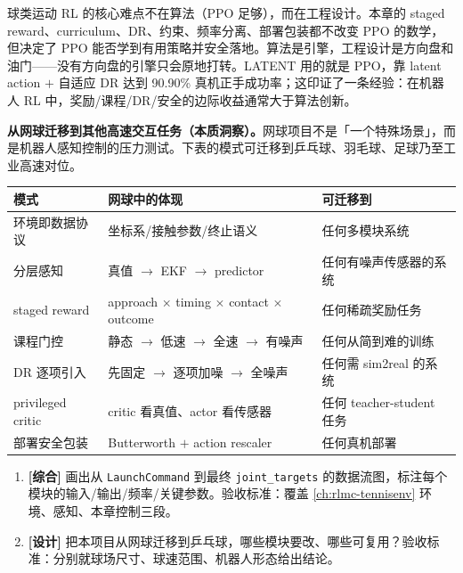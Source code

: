 \begin{insight}\label{ins:rlmc-strike-engineering}
球类运动 RL 的核心难点不在算法（PPO 足够），而在工程设计。本章的 staged reward、curriculum、DR、约束、频率分离、部署包装都不改变 PPO 的数学，但决定了 PPO 能否学到有用策略并安全落地。算法是引擎，工程设计是方向盘和油门——没有方向盘的引擎只会原地打转。LATENT 用的就是 PPO，靠 latent action $+$ 自适应 DR 达到 90.90\% 真机正手成功率；这印证了一条经验：在机器人 RL 中，奖励/课程/DR/安全的边际收益通常大于算法创新。
\end{insight}

\textbf{从网球迁移到其他高速交互任务（本质洞察）。}网球项目不是「一个特殊场景」，而是机器人感知控制的压力测试。下表的模式可迁移到乒乓球、羽毛球、足球乃至工业高速对位。

\begin{center}
\small
\begin{tabular}{@{}lll@{}}
\toprule
模式 & 网球中的体现 & 可迁移到 \\
\midrule
环境即数据协议 & 坐标系/接触参数/终止语义 & 任何多模块系统 \\
分层感知 & 真值 $\to$ EKF $\to$ predictor & 任何有噪声传感器的系统 \\
staged reward & approach $\times$ timing $\times$ contact $\times$ outcome & 任何稀疏奖励任务 \\
课程门控 & 静态 $\to$ 低速 $\to$ 全速 $\to$ 有噪声 & 任何从简到难的训练 \\
DR 逐项引入 & 先固定 $\to$ 逐项加噪 $\to$ 全噪声 & 任何需 sim2real 的系统 \\
privileged critic & critic 看真值、actor 看传感器 & 任何 teacher-student 任务 \\
部署安全包装 & Butterworth $+$ action rescaler & 任何真机部署 \\
\bottomrule
\end{tabular}
\end{center}

\begin{practice}[本节动手任务]
\begin{enumerate}
  \item \textbf{[综合]} 画出从 \verb|LaunchCommand| 到最终 \verb|joint_targets| 的数据流图，标注每个模块的输入/输出/频率/关键参数。验收标准：覆盖 \cref{ch:rlmc-tennisenv} 环境、感知、本章控制三段。
  \item \textbf{[设计]} 把本项目从网球迁移到乒乓球，哪些模块要改、哪些可复用？验收标准：分别就球场尺寸、球速范围、机器人形态给出结论。
\end{enumerate}
\end{practice}

